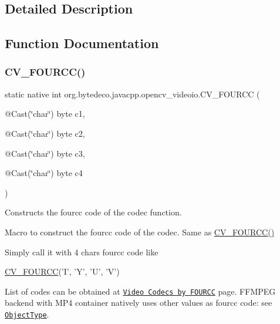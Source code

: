 \subsection{Detailed Description}


\subsection{Function Documentation}
\mbox{\label{group__videoio__c_ga30de218d6d68e6d7ede1b476f71f45db}} 
\subsubsection{\texorpdfstring{C\+V\+\_\+\+F\+O\+U\+R\+C\+C()}{CV\_FOURCC()}}
{\footnotesize\ttfamily static native int org.\+bytedeco.\+javacpp.\+opencv\+\_\+videoio.\+C\+V\+\_\+\+F\+O\+U\+R\+CC (\begin{DoxyParamCaption}\item[{@Cast(\char`\"{}char\char`\"{}) byte}]{c1,  }\item[{@Cast(\char`\"{}char\char`\"{}) byte}]{c2,  }\item[{@Cast(\char`\"{}char\char`\"{}) byte}]{c3,  }\item[{@Cast(\char`\"{}char\char`\"{}) byte}]{c4 }\end{DoxyParamCaption})\hspace{0.3cm}{\ttfamily [static]}}



Constructs the fourcc code of the codec function. 

Macro to construct the fourcc code of the codec. Same as \hyperlink{group__videoio__c_ga30de218d6d68e6d7ede1b476f71f45db}{C\+V\+\_\+\+F\+O\+U\+R\+C\+C()}

Simply call it with 4 chars fourcc code like
\begin{DoxyCode}
\hyperlink{group__videoio__c_ga30de218d6d68e6d7ede1b476f71f45db}{CV\_FOURCC}(\textcolor{charliteral}{'I'}, \textcolor{charliteral}{'Y'}, \textcolor{charliteral}{'U'}, \textcolor{charliteral}{'V'}) 
\end{DoxyCode}
 

List of codes can be obtained at \href{http://www.fourcc.org/codecs.php}{\tt Video Codecs by F\+O\+U\+R\+CC} page. F\+F\+M\+P\+EG backend with M\+P4 container natively uses other values as fourcc code\+: see \href{http://www.mp4ra.org/codecs.html}{\tt Object\+Type}. \mbox{\label{group__videoio__c_gaade4fde0859691fd56cdb50fd9bf62db}} 
